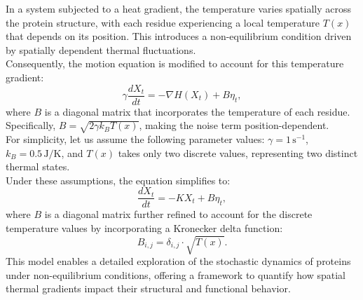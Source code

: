 \documentclass[English, Lau, oneside]{sapthesis}
\begin{document}
In a system subjected to a heat gradient, the temperature varies spatially across the protein structure, with each residue experiencing a local temperature \( T(x) \) that depends on its position.
This introduces a non-equilibrium condition driven by spatially dependent thermal fluctuations.\\ 
Consequently, the motion equation is modified to account for this temperature gradient:
\begin{equation}
    \gamma \frac{dX_t}{dt} = -\nabla H(X_t) + B \eta_t, \label{out_eq}
\end{equation}
where \( B \) is a diagonal matrix that incorporates the temperature of each residue. Specifically, \( B = \sqrt{2 \gamma k_B T(x)} \), making the noise term position-dependent.\\ 
For simplicity, let us assume the following parameter values:
\( \gamma = 1 \, \text{s}^{-1} \), \( k_B = 0.5 \, \text{J/K} \), and \( T(x) \) takes only two discrete values, representing two distinct thermal states.\\
Under these assumptions, the equation simplifies to:
\begin{equation}
    \frac{dX_t}{dt} = -K X_t + B \eta_t,
\end{equation}
where \( B \) is a diagonal matrix further refined to account for the discrete temperature values by incorporating a Kronecker delta function:\\
\begin{equation}
    B_{i,j} = \delta_{i,j} \cdot \sqrt{T(x)}.
\end{equation}
This model enables a detailed exploration of the stochastic dynamics of proteins under non-equilibrium conditions, offering a framework to quantify how spatial thermal gradients impact their structural and functional behavior.
\newpage
\end{document}
